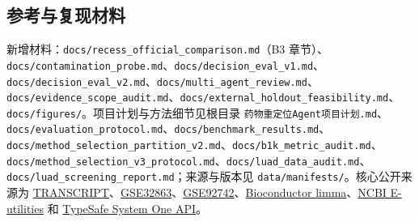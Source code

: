 \documentclass[
  10pt,
]{ctexart}
\begin{document}
\subsection{参考与复现材料}\label{ux53c2ux8003ux4e0eux590dux73b0ux6750ux6599}

新增材料：\texttt{docs/\allowbreak{}recess\_\allowbreak{}official\_\allowbreak{}comparison.\allowbreak{}md}（B3
章节）、\texttt{docs/\allowbreak{}contamination\_\allowbreak{}probe.\allowbreak{}md}、\texttt{docs/\allowbreak{}decision\_\allowbreak{}eval\_\allowbreak{}v1.\allowbreak{}md}、\texttt{docs/\allowbreak{}decision\_\allowbreak{}eval\_\allowbreak{}v2.\allowbreak{}md}、\texttt{docs/\allowbreak{}multi\_\allowbreak{}agent\_\allowbreak{}review.\allowbreak{}md}、\texttt{docs/\allowbreak{}evidence\_\allowbreak{}scope\_\allowbreak{}audit.\allowbreak{}md}、\texttt{docs/\allowbreak{}external\_\allowbreak{}holdout\_\allowbreak{}feasibility.\allowbreak{}md}、\texttt{docs/\allowbreak{}figures/\allowbreak{}}。项目计划与方法细节见根目录
\texttt{药物重定位Agent项目计划.\allowbreak{}md}、\texttt{docs/\allowbreak{}evaluation\_\allowbreak{}protocol.\allowbreak{}md}、\texttt{docs/\allowbreak{}benchmark\_\allowbreak{}results.\allowbreak{}md}、\texttt{docs/\allowbreak{}method\_\allowbreak{}selection\_\allowbreak{}partition\_\allowbreak{}v2.\allowbreak{}md}、\texttt{docs/\allowbreak{}b1k\_\allowbreak{}metric\_\allowbreak{}audit.\allowbreak{}md}、\texttt{docs/\allowbreak{}method\_\allowbreak{}selection\_\allowbreak{}v3\_\allowbreak{}protocol.\allowbreak{}md}、\texttt{docs/\allowbreak{}luad\_\allowbreak{}data\_\allowbreak{}audit.\allowbreak{}md}、\texttt{docs/\allowbreak{}luad\_\allowbreak{}screening\_\allowbreak{}report.\allowbreak{}md}；来源与版本见
\texttt{data/\allowbreak{}manifests/\allowbreak{}}。核心公开来源为
\href{https://zenodo.org/records/7982976}{TRANSCRIPT}、\href{https://www.ncbi.nlm.nih.gov/geo/query/acc.cgi?acc=GSE32863}{GSE32863}、\href{https://www.ncbi.nlm.nih.gov/geo/query/acc.cgi?acc=GSE92742}{GSE92742}、\href{https://bioconductor.org/packages/release/bioc/html/limma.html}{Bioconductor
limma}、\href{https://www.ncbi.nlm.nih.gov/books/NBK25499/}{NCBI
E-utilities} 和 \href{https://api.typesafe.ai/docs}{TypeSafe System One
API}。
\end{document}
